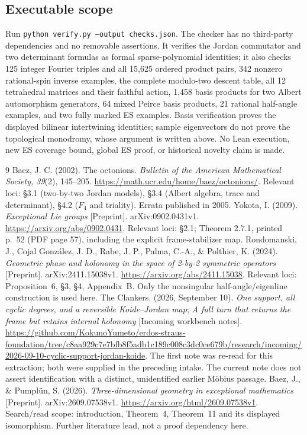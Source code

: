 \documentclass[11pt]{article}
\theoremstyle{definition}\newtheorem{definition}[theorem]{Definition}
\begin{document}
\subsection*{Executable scope}
Run \texttt{python verify.py --output checks.json}. The checker has no third-party dependencies and no removable assertions. It verifies the Jordan commutator and two determinant formulas as formal sparse-polynomial identities; it also checks 125 integer Fourier triples and all 15,625 ordered product pairs, 342 nonzero rational-spin inverse examples, the complete modulo-two descent table, all 12 tetrahedral matrices and their faithful action, 1,458 basis products for two Albert automorphism generators, 64 mixed Peirce basis products, 21 rational half-angle examples, and two fully marked ES examples. Basis verification proves the displayed bilinear intertwining identities; sample eigenvectors do not prove the topological monodromy, whose argument is written above. No Lean execution, new ES coverage bound, global ES proof, or historical novelty claim is made.

\begingroup\small
\begin{thebibliography}{9}\setlength{\itemsep}{2pt}
 Baez, J. C. (2002). The octonions. \emph{Bulletin of the American Mathematical Society, 39}(2), 145--205. \url{https://math.ucr.edu/home/baez/octonions/}. Relevant loci: \S3.1 (two-by-two Jordan models), \S3.4 (Albert algebra, trace and determinant), \S4.2 ($F_4$ and triality). Errata published in 2005.
 Yokota, I. (2009). \emph{Exceptional Lie groups} [Preprint]. arXiv:0902.0431v1. \url{https://arxiv.org/abs/0902.0431}. Relevant loci: \S2.1; Theorem 2.7.1, printed p.~52 (PDF page 57), including the explicit frame-stabilizer map.
 Rondomanski, J., Cojal Gonz\'alez, J. D., Rabe, J. P., Palma, C.-A., \& Polthier, K. (2024). \emph{Geometric phase and holonomy in the space of 2-by-2 symmetric operators} [Preprint]. arXiv:2411.15038v1. \url{https://arxiv.org/abs/2411.15038}. Relevant loci: Proposition~6, \S3, \S4, Appendix~B. Only the nonsingular half-angle/eigenline construction is used here.
 The Clankers. (2026, September 10). \emph{One support, all cyclic degrees, and a reversible Koide--Jordan map}; \emph{A full turn that returns the frame but retains internal holonomy} [Incoming workbench notes]. \url{https://github.com/KokunoYumeto/erdos-straus-foundation/tree/c8aa929c7e7bfb8f5adb1c189c008c3dc0ce679b/research/incoming/2026-09-10-cyclic-support-jordan-koide}. The first note was re-read for this extraction; both were supplied in the preceding intake. The current note does not assert identification with a distinct, unidentified earlier M\"obius passage.
 Baez, J., \& Pumpl\"un, S. (2026). \emph{Three-dimensional geometry in exceptional mathematics} [Preprint]. arXiv:2609.07538v1. \url{https://arxiv.org/html/2609.07538v1}. Search/read scope: introduction, Theorem~4, Theorem~11 and its displayed isomorphism. Further literature lead, not a proof dependency here.
\end{thebibliography}
\endgroup
\end{document}
